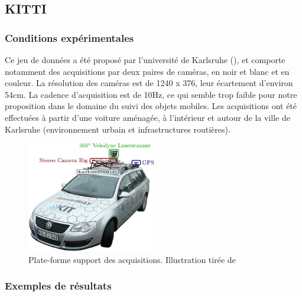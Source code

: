 \subsection{KITTI} \label{fig:ch6_kitti}
\subsubsection{Conditions expérimentales}
Ce jeu de données a été proposé par l'université de Karlsruhe (\cite{Geiger2012}), et comporte notamment des acquisitions par deux paires de caméras, en noir et blanc et en couleur. La résolution des caméras est de 1240 x 376, leur écartement d'environ 54cm. La cadence d'acquisition est de 10Hz, ce qui semble trop faible pour notre proposition dans le domaine du suivi des objets mobiles. Les acquisitions ont été effectuées à partir d'une voiture aménagée, à l'intérieur et autour de la ville de Karlsruhe (environnement urbain et infrastructures routières).

\begin{figure}
	\centerline {
		\includegraphics[width=0.5\textwidth]{Chapter6/graphics/kitti_platform.jpg}
	}
	\caption{Plate-forme support des acquisitions. Illustration tirée de \cite{Geiger2012}}
	\label{fig:ch6_kitti_setup}
\end{figure}


\subsubsection{Exemples de résultats}
